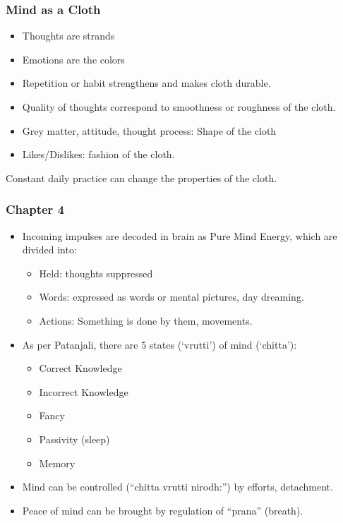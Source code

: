\begin{frame}[fragile]
\frametitle{Mind as a Cloth}
\begin{itemize}
\item Thoughts are strands
\item Emotions are the colors
\item Repetition or habit strengthens and makes cloth durable.
\item Quality of thoughts correspond to smoothness or roughness of the cloth.
\item Grey matter, attitude, thought process: Shape of the cloth
\item Likes/Dislikes: fashion of the cloth.
\end{itemize}

Constant daily practice can change the properties of the cloth.
\end{frame}

\begin{frame}[fragile]
\frametitle{Chapter 4}
\begin{itemize}
\item Incoming impulses are decoded in brain as Pure Mind Energy, which are divided into:

\begin{itemize}
\item Held: thoughts suppressed
\item Words: expressed as words or mental pictures, day dreaming.
\item Actions: Something is done by them, movements.
\end{itemize}
\item As per Patanjali, there are 5 states (`vrutti') of mind (`chitta'):
\begin{itemize}
\item Correct Knowledge
\item Incorrect Knowledge
\item Fancy
\item Passivity (sleep)
\item Memory
\end{itemize}
\item Mind can be controlled (``chitta vrutti nirodh:'') by efforts, detachment.
\item Peace of mind can be brought by regulation of ``prana'' (breath).
\end{itemize}

\end{frame}

